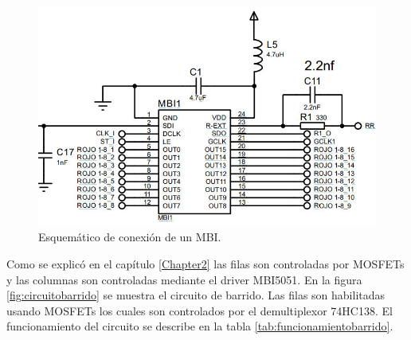 \begin{figure}[htpb]
	\centering
    \includegraphics[scale=0.4]{Figures/circuitombi.jpg} 
	\caption{Esquemático de conexión de un MBI.}
	\label{fig:circuitombi}
\end{figure}



Como se explicó en el capítulo \ref{Chapter2} las filas son controladas por MOSFETs y las columnas son controladas mediante el driver MBI5051. En la figura \ref{fig:circuitobarrido} se muestra el circuito de barrido. Las filas son habilitadas usando MOSFETs los cuales son controlados por el demultiplexor 74HC138. El funcionamiento del circuito se describe en la tabla \ref{tab:funcionamientobarrido}.

